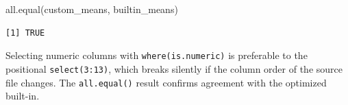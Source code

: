 \documentclass[
  letterpaper,
  DIV=11,
  numbers=noendperiod]{scrreprt}
\newenvironment{Shaded}{\begin{snugshade}}{\end{snugshade}}
\newcommand{\FunctionTok}[1]{\textcolor[rgb]{0.28,0.35,0.67}{#1}}
\newcommand{\NormalTok}[1]{\textcolor[rgb]{0.00,0.23,0.31}{#1}}
\renewcommand{\[}{\begin{equation}}
\renewcommand{\]}{\end{equation}}
\begin{document}
\begin{table}

\caption{\label{tbl-means-custom-vs-builtin}Comparing column means:
custom function vs.~base R colMeans()}


\end{table}%

\begin{Shaded}
\begin{Highlighting}[]
\FunctionTok{all.equal}\NormalTok{(custom\_means, builtin\_means)}
\end{Highlighting}
\end{Shaded}

\begin{verbatim}
[1] TRUE
\end{verbatim}

Selecting numeric columns with \texttt{where(is.numeric)} is preferable
to the positional \texttt{select(3:13)}, which breaks silently if the
column order of the source file changes. The \texttt{all.equal()} result
confirms agreement with the optimized built-in.
\end{document}
